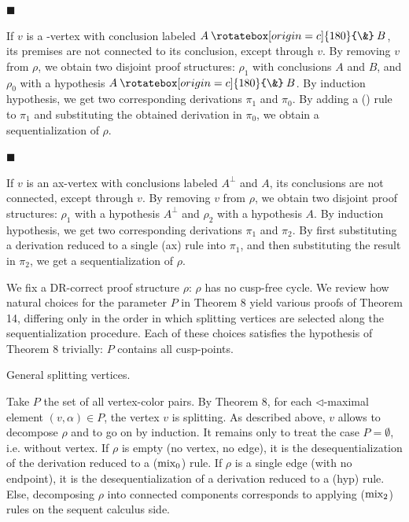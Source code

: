 \documentclass[10pt,a4paper]{amsart}
\providecommand{\invamp}{\mathbin{\rotatebox[origin=c]{180}{\&}}}
\begin{document}
 
 
\par\noindent  $\blacksquare$ 
 
If $v$ is a -vertex with conclusion labeled $A\invamp B$, its premises are not connected to its conclusion, except through $v$. By removing $v$ from $\rho$, we obtain two disjoint proof structures: $\rho_{1}$ with conclusions $A$ and $B$, and $\rho_{0}$ with a hypothesis $A\invamp B$. By induction hypothesis, we get two corresponding derivations $\pi_{1}$ and $\pi_{0}$. By adding a () rule to $\pi_{1}$ and substituting the obtained derivation in $\pi_{0}$, we obtain a sequentialization of $\rho$.\par
 
 
 
\par\noindent  $\blacksquare$ 
 
If $v$ is an ax-vertex with conclusions labeled $A^{\perp}$ and $A$, its conclusions are not connected, except through $v$. By removing $v$ from $\rho$, we obtain two disjoint proof structures: $\rho_{1}$ with a hypothesis $A^{\perp}$ and $\rho_{2}$ with a hypothesis $A$. By induction hypothesis, we get two corresponding derivations $\pi_{1}$ and $\pi_{2}$. By first substituting a derivation reduced to a single (ax) rule into $\pi_{1}$, and then substituting the result in $\pi_{2}$, we get a sequentialization of $\rho$.\par
 
 
  
 
 
We fix a DR-correct proof structure $\rho$: $\rho$ has no cusp-free cycle. We review how natural choices for the parameter $P$ in Theorem 8 yield various proofs of Theorem 14, differing only in the order in which splitting vertices are selected along the sequentialization procedure. Each of these choices satisfies the hypothesis of Theorem 8 trivially: $P$ contains all cusp-points.\par
  General splitting vertices.  
 
Take $P$ the set of all vertex-color pairs. By Theorem 8, for each $\lhd$-maximal element $(v,\alpha)\in P$, the vertex $v$ is splitting. As described above, $v$ allows to decompose $\rho$ and to go on by induction. It remains only to treat the case $P=\emptyset$, i.e. without vertex. If $\rho$ is empty (no vertex, no edge), it is the desequentialization of the derivation reduced to a ($\textnormal{{mix}}_{0}$) rule. If $\rho$ is a single edge (with no endpoint), it is the desequentialization of a derivation reduced to a (hyp) rule. Else, decomposing $\rho$ into connected components corresponds to applying ($\textnormal{{mix}}_{2}$) rules on the sequent calculus side.\par
 
\end{document}
